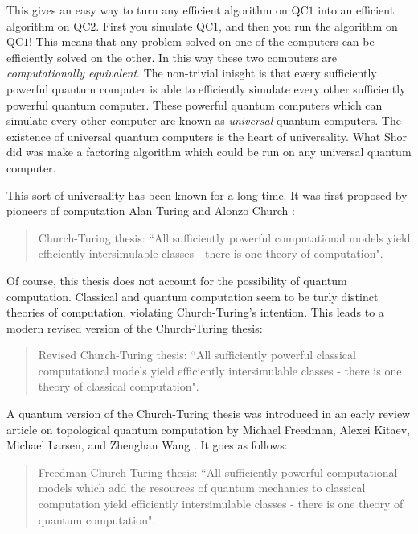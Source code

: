 \documentclass{article}
\theoremstyle{definition}
\numberwithin{figure}{section}
\begin{document}
This gives an easy way to turn any efficient algorithm on $\text{QC}1$ into an efficient algorithm on $\text{QC}2$. First you simulate $\text{QC}1$, and then you run the algorithm on $\text{QC}1$! This means that any problem solved on one of the computers can be efficiently solved on the other. In this way these two computers are \textit{computationally equivalent}. The non-trivial inisght is that every sufficiently powerful quantum computer is able to efficiently simulate every other sufficiently powerful quantum computer. These powerful quantum computers which can simulate every other computer are known as \textit{universal} quantum computers. The existence of universal quantum computers is the heart of universality. What Shor did was make a factoring algorithm which could be run on any universal quantum computer.

This sort of universality has been known for a long time. It was first proposed by pioneers of computation Alan Turing and Alonzo Church \cite{turing1939systems, copeland1997church}:

\begin{quote}
Church-Turing thesis: ``All sufficiently powerful computational models yield efficiently intersimulable classes - there is one theory of computation".
\end{quote}

Of course, this thesis does not account for the possibility of quantum computation. Classical and quantum computation seem to be turly distinct theories of computation, violating Church-Turing's intention. This leads to a modern revised version of the Church-Turing thesis:

\begin{quote}
Revised Church-Turing thesis: ``All sufficiently powerful classical computational models yield efficiently intersimulable classes - there is one theory of classical computation".
\end{quote}

A quantum version of the Church-Turing thesis was introduced in an early review article on topological quantum computation by Michael Freedman, Alexei Kitaev, Michael Larsen, and Zhenghan Wang \cite{freedman2003topological}. It goes as follows:

\begin{quote}
Freedman-Church-Turing thesis: ``All sufficiently powerful computational models which add the resources of quantum mechanics to classical computation yield efficiently intersimulable classes - there is one theory of quantum computation".
\end{quote}
\end{document}
